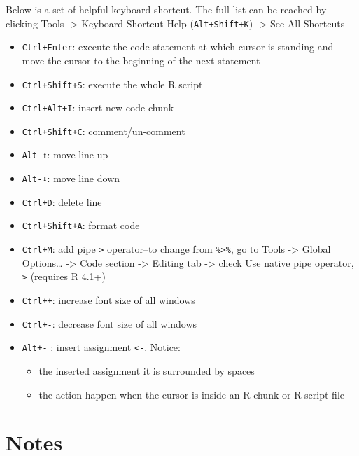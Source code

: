 \documentclass[
  letterpaper,
  DIV=11,
  numbers=noendperiod]{scrreprt}
\providecommand{\tightlist}{%
  \setlength{\itemsep}{0pt}\setlength{\parskip}{0pt}}\usepackage{longtable,booktabs,array}
\begin{document}
Below is a set of helpful keyboard shortcut. The full list can be
reached by clicking Tools -\textgreater{} Keyboard Shortcut Help
(\texttt{Alt+Shift+K}) -\textgreater{} See All Shortcuts

\begin{itemize}
\tightlist
\item
  \texttt{Ctrl+Enter}: execute the code statement at which cursor is
  standing and move the cursor to the beginning of the next statement
\item
  \texttt{Ctrl+Shift+S}: execute the whole R script
\item
  \texttt{Ctrl+Alt+I}: insert new code chunk
\item
  \texttt{Ctrl+Shift+C}: comment/un-comment
\item
  \texttt{Alt-⬆️}: move line up
\item
  \texttt{Alt-⬇️️}: move line down
\item
  \texttt{Ctrl+D}: delete line
\item
  \texttt{Ctrl+Shift+A}: format code
\item
  \texttt{Ctrl+M}: add pipe \texttt{\textbar{}\textgreater{}}
  operator--to change from \texttt{\%\textgreater{}\%}, go to Tools
  -\textgreater{} Global Options\ldots{} -\textgreater{} Code section
  -\textgreater{} Editing tab -\textgreater{} check Use native pipe
  operator, \texttt{\textbar{}\textgreater{}} (requires R 4.1+)
\item
  \texttt{Ctrl++}: increase font size of all windows
\item
  \texttt{Ctrl+-}: decrease font size of all windows
\item
  \texttt{Alt+-} : insert assignment \texttt{\textless{}-}. Notice:

  \begin{itemize}
  \tightlist
  \item
    the inserted assignment it is surrounded by spaces
  \item
    the action happen when the cursor is inside an R chunk or R script
    file
  \end{itemize}
\end{itemize}

\section{Notes}\label{notes}
\end{document}
